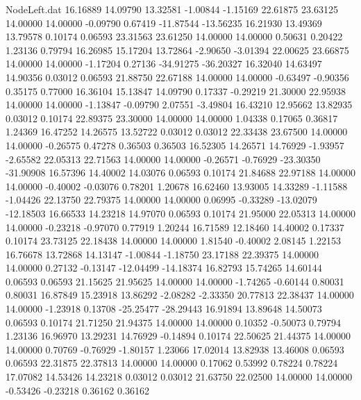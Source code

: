 \begin{filecontents}{NodeLeft.dat}
  16.16889   14.09790   13.32581    -1.00844   -1.15169   22.61875   23.63125   14.00000   14.00000   -0.09790    0.67419  -11.87544  -13.56235
  16.21930   13.49369   13.79578     0.10174    0.06593   23.31563   23.61250   14.00000   14.00000    0.50631    0.20422    1.23136    0.79794
  16.26985   15.17204   13.72864    -2.90650   -3.01394   22.00625   23.66875   14.00000   14.00000   -1.17204    0.27136  -34.91275  -36.20327
  16.32040   14.63497   14.90356     0.03012    0.06593   21.88750   22.67188   14.00000   14.00000   -0.63497   -0.90356    0.35175    0.77000
  16.36104   15.13847   14.09790     0.17337   -0.29219   21.30000   22.95938   14.00000   14.00000   -1.13847   -0.09790    2.07551   -3.49804
  16.43210   12.95662   13.82935     0.03012    0.10174   22.89375   23.30000   14.00000   14.00000    1.04338    0.17065    0.36817    1.24369
  16.47252   14.26575   13.52722     0.03012    0.03012   22.33438   23.67500   14.00000   14.00000   -0.26575    0.47278    0.36503    0.36503
  16.52305   14.26571   14.76929    -1.93957   -2.65582   22.05313   22.71563   14.00000   14.00000   -0.26571   -0.76929  -23.30350  -31.90908
  16.57396   14.40002   14.03076     0.06593    0.10174   21.84688   22.97188   14.00000   14.00000   -0.40002   -0.03076    0.78201    1.20678
  16.62460   13.93005   14.33289    -1.11588   -1.04426   22.13750   22.79375   14.00000   14.00000    0.06995   -0.33289  -13.02079  -12.18503
  16.66533   14.23218   14.97070     0.06593    0.10174   21.95000   22.05313   14.00000   14.00000   -0.23218   -0.97070    0.77919    1.20244
  16.71589   12.18460   14.40002     0.17337    0.10174   23.73125   22.18438   14.00000   14.00000    1.81540   -0.40002    2.08145    1.22153
  16.76678   13.72868   14.13147    -1.00844   -1.18750   23.17188   22.39375   14.00000   14.00000    0.27132   -0.13147  -12.04499  -14.18374
  16.82793   15.74265   14.60144     0.06593    0.06593   21.15625   21.95625   14.00000   14.00000   -1.74265   -0.60144    0.80031    0.80031
  16.87849   15.23918   13.86292    -2.08282   -2.33350   20.77813   22.38437   14.00000   14.00000   -1.23918    0.13708  -25.25477  -28.29443
  16.91894   13.89648   14.50073     0.06593    0.10174   21.71250   21.94375   14.00000   14.00000    0.10352   -0.50073    0.79794    1.23136
  16.96970   13.29231   14.76929    -0.14894    0.10174   22.50625   21.44375   14.00000   14.00000    0.70769   -0.76929   -1.80157    1.23066
  17.02014   13.82938   13.46008     0.06593    0.06593   22.31875   22.37813   14.00000   14.00000    0.17062    0.53992    0.78224    0.78224
  17.07082   14.53426   14.23218     0.03012    0.03012   21.63750   22.02500   14.00000   14.00000   -0.53426   -0.23218    0.36162    0.36162

\end{filecontents}
